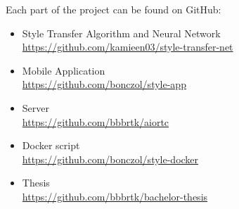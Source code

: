 \documentclass[../Main.tex]{subfiles}
\begin{document}
    Each part of the project can be found on GitHub:

    \begin{itemize}
        \item{
        Style Transfer Algorithm and Neural Network \\
        \url{https://github.com/kamieen03/style-transfer-net}
            }
        \item{ 
        Mobile Application \\
        \url{https://github.com/bonczol/style-app}
            }
        \item {
        Server \\
        \url{https://github.com/bbbrtk/aiortc}
            }
        \item {
        Docker script \\
        \url{https://github.com/bonczol/style-docker}
            }
        \item {
        Thesis \\
        \url{https://github.com/bbbrtk/bachelor-thesis}
        }
    \end{itemize}
\biblio %
\end{document}
